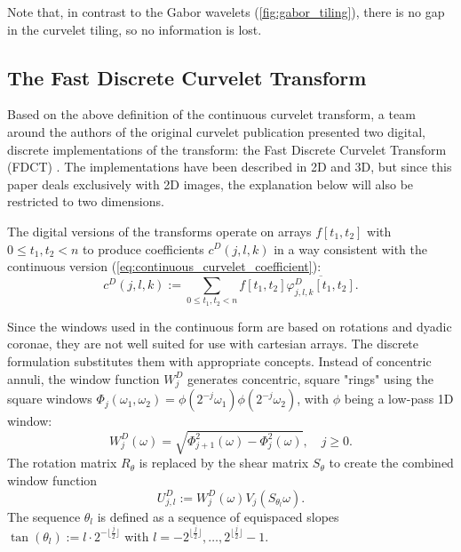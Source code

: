 Note that, in contrast to the Gabor wavelets (\autoref{fig:gabor_tiling}),
there is no gap in the curvelet tiling, so no information is lost.

\subsection{The Fast Discrete Curvelet Transform}\label{sec:background_fdct}

Based on the above definition of the continuous curvelet transform, a team
around the authors of the original curvelet publication presented two digital,
discrete implementations of the transform: the Fast Discrete Curvelet Transform
(FDCT) \autocite{candes_fast_2006}. The implementations have been described in
2D and 3D, but since this paper deals exclusively with 2D images, the
explanation below will also be restricted to two dimensions.

The digital versions of the transforms operate on arrays $f[t_1, t_2]$ with $0
\leq t_1, t_2 < n$ to produce coefficients $c^D(j, l, k)$ in a way
consistent with the continuous version
(\autoref{eq:continuous_curvelet_coefficient}):
\begin{equation}
    c^D(j, l, k) := \sum_{0 \leq t_1, t_2 < n} f[t_1, t_2] \overline{\varphi_{j, l, k}^D[t_1, t_2]}.
\end{equation}

Since the windows used in the continuous form are based on rotations and dyadic
coronae, they are not well suited for use with cartesian arrays. The discrete
formulation substitutes them with appropriate concepts. Instead of concentric
annuli, the window function $W^D_j$ generates concentric, square "rings" using
the square windows $\Phi_j(\omega_1, \omega_2) = \phi(2^{-j}\omega_1)
\phi(2^{-j}\omega_2)$, with $\phi$ being a low-pass 1D window:
\begin{equation*}
    W_j^D(\omega) = \sqrt{\Phi_{j+1}^2(\omega) - \Phi_j^2(\omega)}, \quad j \geq 0.
\end{equation*}
The rotation matrix $R_{\theta}$ is replaced by the shear matrix $S_{\theta}$
to create the combined window function
\begin{equation*}
    U_{j, l}^D := W_j^D(\omega) V_j(S_{\theta_l}\omega).
\end{equation*}
The sequence $\theta_l$ is defined as a sequence of equispaced slopes
$\tan(\theta_l) := l \cdot 2^{- \lfloor \frac{j}{2} \rfloor}$ with
$l=-2^{\lfloor \frac{j}{2} \rfloor}, \dots, 2^{\lfloor \frac{j}{2} \rfloor} -
1$.

